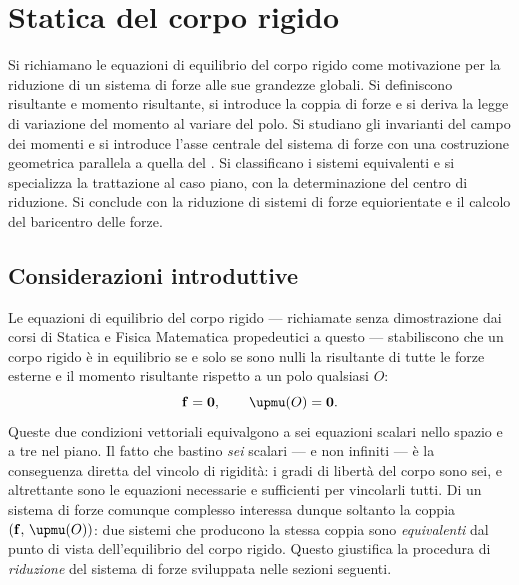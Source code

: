 \graphicspath{{Parti/P03-Meccanica_SR/C02-Statica_CR/Figure/}}
\chapter{Statica del corpo rigido}\label{cap:statica_CR}


\begin{sommario}
	Si richiamano le equazioni di equilibrio del corpo rigido
	come motivazione per la riduzione di un sistema di forze
	alle sue grandezze globali. Si definiscono risultante e
	momento risultante, si introduce la coppia di forze e si
	deriva la legge di variazione del momento al variare del
	polo. Si studiano gli invarianti del campo dei momenti e
	si introduce l'asse centrale del sistema di forze con una
	costruzione geometrica parallela a quella del
	. Si classificano i
	sistemi equivalenti e si specializza la trattazione al
	caso piano, con la determinazione del centro di riduzione.
	Si conclude con la riduzione di sistemi di forze
	equiorientate e il calcolo del baricentro delle forze.
\end{sommario}


\section{Considerazioni introduttive}

Le equazioni di equilibrio del corpo rigido --- richiamate senza
dimostrazione dai corsi di Statica e Fisica Matematica propedeutici
a questo --- stabiliscono che un corpo rigido è in equilibrio se e
solo se sono nulli la risultante di tutte le forze esterne e il
momento risultante rispetto a un polo qualsiasi $O$:
\begin{equation}\label{eq:equilibrio_CR}
	\fb = \zerovb, \qquad \bm{\upmu}(O) = \zerovb.
\end{equation}
Queste due condizioni vettoriali equivalgono a sei equazioni
scalari nello spazio e a tre nel piano. Il fatto che bastino
\textit{sei} scalari --- e non infiniti --- è la conseguenza
diretta del vincolo di rigidità: i gradi di libertà del corpo
sono sei, e altrettante sono le equazioni necessarie e sufficienti
per vincolarli tutti. Di un sistema di forze comunque complesso
interessa dunque soltanto la coppia $(\fb,\,\bm{\upmu}(O))$: due
sistemi che producono la stessa coppia sono \textit{equivalenti}
dal punto di vista dell'equilibrio del corpo rigido. Questo
giustifica la procedura di \textit{riduzione} del sistema di
forze sviluppata nelle sezioni seguenti.


